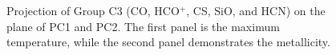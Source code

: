 \documentclass{aa}
\begin{document}
\begin{CJK*}{UTF8}{gbsn}
    \begin{figure}[htbp]
        \centering
        \caption{Projection of Group C3 (CO, HCO$^+$, CS, SiO, and HCN) on the plane of PC1 and PC2. The first panel is the maximum temperature, while the second panel demonstrates the metallicity.}
        \label{C3-12}
    \end{figure} 


\end{CJK*}
\end{document}
